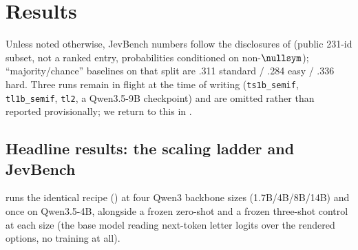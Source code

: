 \section{Results}
\label{sec:results}

Unless noted otherwise, JevBench numbers follow the disclosures of 
(public 231-id subset, not a ranked entry, probabilities conditioned on non-$\nullsym$); ``majority/chance''
baselines on that split are .311 standard / .284 easy / .336 hard. Three runs remain in flight at the time
of writing (\texttt{ts1b\_semif}, \texttt{tl1b\_semif}, \texttt{tl2}, a Qwen3.5-9B checkpoint) and are
omitted rather than reported provisionally; we return to this in .

\subsection{Headline results: the scaling ladder and JevBench}
\label{sec:results:headline}

 runs the identical recipe () at four Qwen3 backbone sizes
(1.7B/4B/8B/14B) and once on Qwen3.5-4B, alongside a frozen zero-shot and a frozen three-shot control at
each size (the base model reading next-token letter logits over the rendered options, no training at all).

